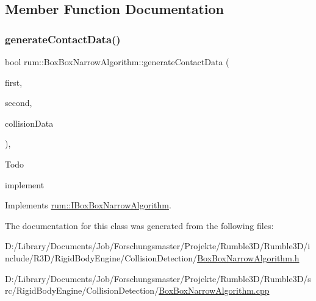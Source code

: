 \subsection{Member Function Documentation}
\mbox{\label{classrum_1_1_box_box_narrow_algorithm_a5af29d0be22a3d56408d987643830058}} 
\subsubsection{\texorpdfstring{generate\+Contact\+Data()}{generateContactData()}}
{\footnotesize\ttfamily bool rum\+::\+Box\+Box\+Narrow\+Algorithm\+::generate\+Contact\+Data (\begin{DoxyParamCaption}\item[{\mbox{\hyperlink{classrum_1_1_collision_box}{Collision\+Box}} $\ast$}]{first,  }\item[{\mbox{\hyperlink{classrum_1_1_collision_box}{Collision\+Box}} $\ast$}]{second,  }\item[{\mbox{\hyperlink{classrum_1_1_collision_data}{Collision\+Data}} \&}]{collision\+Data }\end{DoxyParamCaption})\hspace{0.3cm}{\ttfamily [override]}, {\ttfamily [virtual]}}

\begin{DoxyRefDesc}{Todo}
\item[\mbox{\hyperlink{todo__todo000002}{Todo}}]implement \end{DoxyRefDesc}


Implements \mbox{\hyperlink{classrum_1_1_i_box_box_narrow_algorithm_a9e35387b3c982ab0431fab9ceda5f6a6}{rum\+::\+I\+Box\+Box\+Narrow\+Algorithm}}.



The documentation for this class was generated from the following files\+:\begin{DoxyCompactItemize}
\item 
D\+:/\+Library/\+Documents/\+Job/\+Forschungsmaster/\+Projekte/\+Rumble3\+D/\+Rumble3\+D/include/\+R3\+D/\+Rigid\+Body\+Engine/\+Collision\+Detection/\mbox{\hyperlink{_box_box_narrow_algorithm_8h}{Box\+Box\+Narrow\+Algorithm.\+h}}\item 
D\+:/\+Library/\+Documents/\+Job/\+Forschungsmaster/\+Projekte/\+Rumble3\+D/\+Rumble3\+D/src/\+Rigid\+Body\+Engine/\+Collision\+Detection/\mbox{\hyperlink{_box_box_narrow_algorithm_8cpp}{Box\+Box\+Narrow\+Algorithm.\+cpp}}\end{DoxyCompactItemize}
